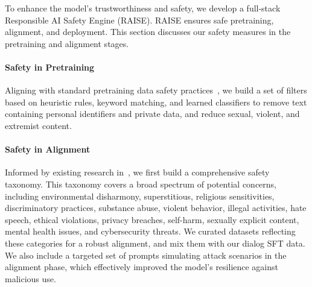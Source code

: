 To enhance the model's trustworthiness and safety, we develop a full-stack Responsible AI Safety Engine (RAISE). 
RAISE ensures safe pretraining, alignment, and deployment.
This section discusses our safety measures in the pretraining and alignment stages.

\paragraph{Safety in Pretraining}
Aligning with standard pretraining data safety practices~\citep{llama2, rae2021scaling, brown2020language}, we build a set of filters based on heuristic rules, keyword matching, and learned classifiers
to remove text containing personal identifiers and private data, and reduce sexual, violent, and extremist content. 

\paragraph{Safety in Alignment}
Informed by existing research in~\citep{glaese2022improving, ji2023beavertails}, we first build a comprehensive safety taxonomy. 
This taxonomy covers a broad spectrum of potential concerns, including environmental disharmony, superstitious, religious sensitivities, discriminatory practices, substance abuse, violent behavior, illegal activities, hate speech, ethical violations, privacy breaches, self-harm, sexually explicit content, mental health issues, and cybersecurity threats. We curated datasets reflecting these categories for a robust alignment, and mix them with our dialog SFT data.
We also include a targeted set of prompts simulating attack scenarios in the alignment phase, which effectively improved the model's resilience against malicious use.